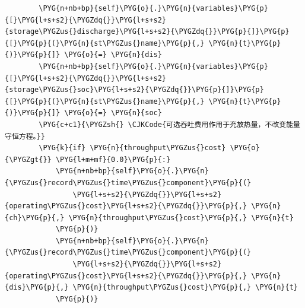 \begin{Verbatim}
        \PYG{n+nb+bp}{self}\PYG{o}{.}\PYG{n}{variables}\PYG{p}{[}\PYG{l+s+s2}{\PYGZdq{}}\PYG{l+s+s2}{storage\PYGZus{}discharge}\PYG{l+s+s2}{\PYGZdq{}}\PYG{p}{]}\PYG{p}{[}\PYG{p}{(}\PYG{n}{st\PYGZus{}name}\PYG{p}{,} \PYG{n}{t}\PYG{p}{)}\PYG{p}{]} \PYG{o}{=} \PYG{n}{dis}
        \PYG{n+nb+bp}{self}\PYG{o}{.}\PYG{n}{variables}\PYG{p}{[}\PYG{l+s+s2}{\PYGZdq{}}\PYG{l+s+s2}{storage\PYGZus{}soc}\PYG{l+s+s2}{\PYGZdq{}}\PYG{p}{]}\PYG{p}{[}\PYG{p}{(}\PYG{n}{st\PYGZus{}name}\PYG{p}{,} \PYG{n}{t}\PYG{p}{)}\PYG{p}{]} \PYG{o}{=} \PYG{n}{soc}
        \PYG{c+c1}{\PYGZsh{} \CJKCode{可选吞吐费用作用于充放热量，不改变能量守恒方程。}}
        \PYG{k}{if} \PYG{n}{throughput\PYGZus{}cost} \PYG{o}{\PYGZgt{}} \PYG{l+m+mf}{0.0}\PYG{p}{:}
            \PYG{n+nb+bp}{self}\PYG{o}{.}\PYG{n}{\PYGZus{}record\PYGZus{}time\PYGZus{}component}\PYG{p}{(}
                \PYG{l+s+s2}{\PYGZdq{}}\PYG{l+s+s2}{operating\PYGZus{}cost}\PYG{l+s+s2}{\PYGZdq{}}\PYG{p}{,} \PYG{n}{ch}\PYG{p}{,} \PYG{n}{throughput\PYGZus{}cost}\PYG{p}{,} \PYG{n}{t}
            \PYG{p}{)}
            \PYG{n+nb+bp}{self}\PYG{o}{.}\PYG{n}{\PYGZus{}record\PYGZus{}time\PYGZus{}component}\PYG{p}{(}
                \PYG{l+s+s2}{\PYGZdq{}}\PYG{l+s+s2}{operating\PYGZus{}cost}\PYG{l+s+s2}{\PYGZdq{}}\PYG{p}{,} \PYG{n}{dis}\PYG{p}{,} \PYG{n}{throughput\PYGZus{}cost}\PYG{p}{,} \PYG{n}{t}
            \PYG{p}{)}


\end{Verbatim}

